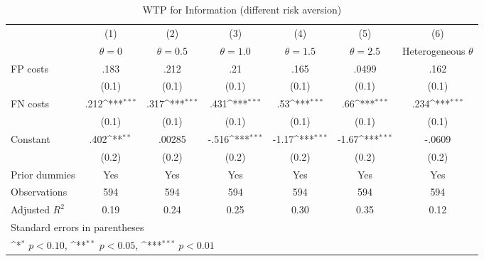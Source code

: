 \begin{table}[htbp]\centering
\def\sym#1{\ifmmode^{#1}\else\(^{#1}\)\fi}
\caption{WTP for Information (different risk aversion)}
\begin{tabular}{l*{6}{c}}
\hline\hline
                &\multicolumn{1}{c}{(1)}&\multicolumn{1}{c}{(2)}&\multicolumn{1}{c}{(3)}&\multicolumn{1}{c}{(4)}&\multicolumn{1}{c}{(5)}&\multicolumn{1}{c}{(6)}\\
                &\multicolumn{1}{c}{$\theta=0$}&\multicolumn{1}{c}{$\theta=0.5$}&\multicolumn{1}{c}{$\theta=1.0$}&\multicolumn{1}{c}{$\theta=1.5$}&\multicolumn{1}{c}{$\theta=2.5$}&\multicolumn{1}{c}{Heterogeneous $\theta$}\\
\hline
FP costs        &     .183         &     .212         &      .21         &     .165         &    .0499         &     .162         \\
                &    (0.1)         &    (0.1)         &    (0.1)         &    (0.1)         &    (0.1)         &    (0.1)         \\
FN costs        &     .212\sym{***}&     .317\sym{***}&     .431\sym{***}&      .53\sym{***}&      .66\sym{***}&     .234\sym{***}\\
                &    (0.1)         &    (0.1)         &    (0.1)         &    (0.1)         &    (0.1)         &    (0.1)         \\
Constant        &     .402\sym{**} &   .00285         &    -.516\sym{***}&    -1.17\sym{***}&    -1.67\sym{***}&   -.0609         \\
                &    (0.2)         &    (0.2)         &    (0.2)         &    (0.2)         &    (0.2)         &    (0.2)         \\
Prior dummies   &      Yes         &      Yes         &      Yes         &      Yes         &      Yes         &      Yes         \\
\hline
Observations    &      594         &      594         &      594         &      594         &      594         &      594         \\
Adjusted \(R^{2}\)&     0.19         &     0.24         &     0.25         &     0.30         &     0.35         &     0.12         \\
\hline\hline
\multicolumn{7}{l}{\footnotesize Standard errors in parentheses}\\
\multicolumn{7}{l}{\footnotesize \sym{*} \(p<0.10\), \sym{**} \(p<0.05\), \sym{***} \(p<0.01\)}\\
\end{tabular}
\end{table}

